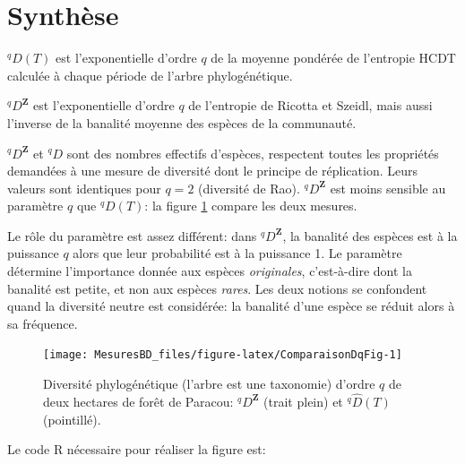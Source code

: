 \documentclass[
  11pt,
  french,
  a4paper,
  extrafontsizes,onecolumn,openright
  ]{memoir}
\begin{document}
\hypertarget{sec-dqzSynthese}{%
\section{Synthèse}\label{sec-dqzSynthese}}

\(^{q}\!D(T)\) est l'exponentielle d'ordre \(q\) de la moyenne pondérée de l'entropie HCDT calculée à chaque période de l'arbre phylogénétique.

\(^q\!D^{\mathbf{Z}}\) est l'exponentielle d'ordre \(q\) de l'entropie de Ricotta et Szeidl, mais aussi l'inverse de la banalité moyenne des espèces de la communauté.

\(^q\!D^{\mathbf{Z}}\) et \(^{q}\!D\) sont des nombres effectifs d'espèces, respectent toutes les propriétés demandées à une mesure de diversité dont le principe de réplication.
Leurs valeurs sont identiques pour \(q=2\) (diversité de Rao).
\(^q\!D^{\mathbf{Z}}\) est moins sensible au paramètre \(q\) que \(^{q}\!D(T)\): la figure \ref{fig:ComparaisonDqFig} compare les deux mesures.

Le rôle du paramètre est assez différent: dans \(^q\!D^{\mathbf{Z}}\), la banalité des espèces est à la puissance \(q\) alors que leur probabilité est à la puissance 1.
Le paramètre détermine l'importance donnée aux espèces \emph{originales}, c'est-à-dire dont la banalité est petite, et non aux espèces \emph{rares}.
Les deux notions se confondent quand la diversité neutre est considérée: la banalité d'une espèce se réduit alors à sa fréquence.



\scriptsize

\begin{figure}

{\centering \texttt{[image: MesuresBD\_files/figure-latex/ComparaisonDqFig-1]} 

}

\caption{Diversité phylogénétique (l'arbre est une taxonomie) d'ordre \(q\) de deux hectares de forêt de Paracou: \(^q\!D^{\mathbf{Z}}\) (trait plein) et \(^{q}\!\hat{D}(T)\) (pointillé).}\label{fig:ComparaisonDqFig}
\end{figure}

\normalsize

Le code R nécessaire pour réaliser la figure est:

\scriptsize
\end{document}
